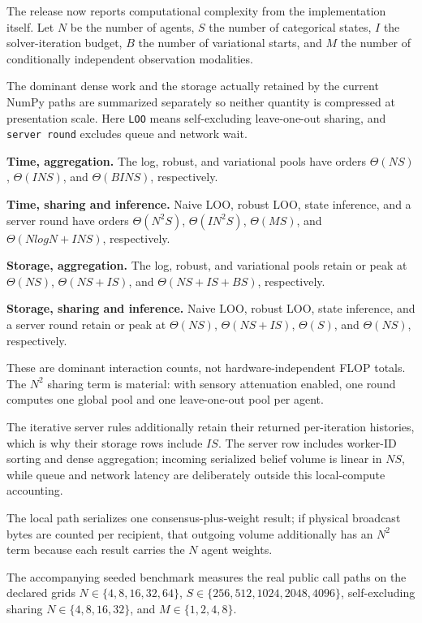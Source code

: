 \documentclass[
  english,
]{article}
\theoremstyle{plain}
\theoremstyle{definition}
\theoremstyle{remark}
\theoremstyle{definition}
\begin{document}
The release now reports computational complexity from the implementation
itself. Let \(N\) be the number of agents, \(S\) the number of
categorical states, \(I\) the solver-iteration budget, \(B\) the number
of variational starts, and \(M\) the number of conditionally independent
observation modalities.

The dominant dense work and the storage actually retained by the current
NumPy paths are summarized separately so neither quantity is compressed
at presentation scale. Here \texttt{LOO} means self-excluding
leave-one-out sharing, and \texttt{server\ round} excludes queue and
network wait.

\textbf{Time, aggregation.} The log, robust, and variational pools have
orders \(\Theta(N S)\), \(\Theta(I N S)\), and \(\Theta(B I N S)\),
respectively.

\textbf{Time, sharing and inference.} Naive LOO, robust LOO, state
inference, and a server round have orders \(\Theta(N^2 S)\),
\(\Theta(I N^2 S)\), \(\Theta(M S)\), and \(\Theta(N log N + I N S)\),
respectively.

\textbf{Storage, aggregation.} The log, robust, and variational pools
retain or peak at \(\Theta(N S)\), \(\Theta(N S + I S)\), and
\(\Theta(N S + I S + B S)\), respectively.

\textbf{Storage, sharing and inference.} Naive LOO, robust LOO, state
inference, and a server round retain or peak at \(\Theta(N S)\),
\(\Theta(N S + I S)\), \(\Theta(S)\), and \(\Theta(N S)\), respectively.

These are dominant interaction counts, not hardware-independent FLOP
totals. The \(N^2\) sharing term is material: with sensory attenuation
enabled, one round computes one global pool and one leave-one-out pool
per agent.

The iterative server rules additionally retain their returned
per-iteration histories, which is why their storage rows include
\(I S\). The server row includes worker-ID sorting and dense
aggregation; incoming serialized belief volume is linear in \(N S\),
while queue and network latency are deliberately outside this
local-compute accounting.

The local path serializes one consensus-plus-weight result; if physical
broadcast bytes are counted per recipient, that outgoing volume
additionally has an \(N^2\) term because each result carries the \(N\)
agent weights.

The accompanying seeded benchmark measures the real public call paths on
the declared grids \(N \in \{4, 8, 16, 32, 64\}\), \(S \in
\{256, 512, 1024, 2048, 4096\}\), self-excluding sharing \(N \in
\{4, 8, 16, 32\}\), and \(M \in
\{1, 2, 4, 8\}\).
\end{document}
